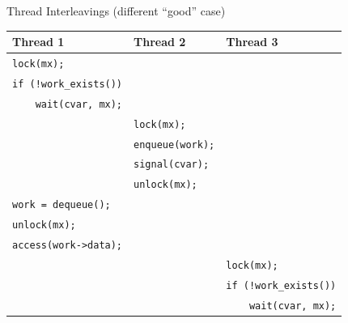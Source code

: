 \documentclass[xcolor=dvipsnames]{beamer}
\begin{document}
\begin{frame}{Thread Interleavings (different ``good'' case)}
	\begin{center}
		\begin{tabular}{|l|l|l|}
			\hline
			\cellcolor{thread1} {\bf Thread 1} & \cellcolor{thread2} {\bf Thread 2} & \cellcolor{thread3} {\bf Thread 3} \\
			\hline
			\small \texttt{lock(mx);} & & \\
			\small \texttt{if~(!work\_exists())} & & \\
			\small \texttt{~~~~wait(cvar,~mx);} & & \\
			
			& \small \texttt{lock(mx);} & \\
			& \small \texttt{enqueue(work);} & \\
			& \small \texttt{signal(cvar);} & \\
			& \small \texttt{unlock(mx);} & \\
			
			\small \texttt{work~=~dequeue();~} & & \\
			\small \texttt{unlock(mx);} & & \\
			\small \texttt{access(work->data);}& & \\
			
			& & \small \texttt{lock(mx);} \\
			& & \small \texttt{if~(!work\_exists())} \\
			& & \small \texttt{~~~~wait(cvar,~mx);} \\
			\hline
		\end{tabular}
	\end{center}
\end{frame}
\end{document}
